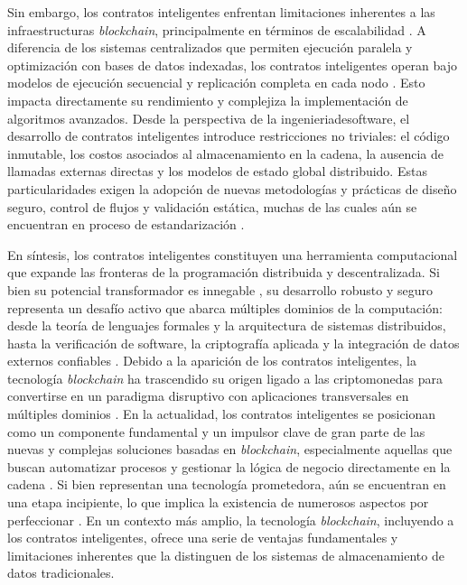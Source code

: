 Sin embargo, los contratos inteligentes enfrentan limitaciones inherentes a las infraestructuras \textit{blockchain}, principalmente en términos de escalabilidad \cite{kalajdjieski2023databases}. A diferencia de los sistemas centralizados que permiten ejecución paralela y optimización con bases de datos indexadas, los contratos inteligentes operan bajo modelos de ejecución secuencial y replicación completa en cada nodo \cite{taherdoost2023smart}. Esto impacta directamente su rendimiento y complejiza la implementación de algoritmos avanzados. Desde la perspectiva de la \gls{ingenieriadesoftware}, el desarrollo de contratos inteligentes introduce restricciones no triviales: el código inmutable, los costos asociados al almacenamiento en la cadena, la ausencia de llamadas externas directas y los modelos de estado global distribuido. Estas particularidades exigen la adopción de nuevas metodologías y prácticas de diseño seguro, control de flujos y validación estática, muchas de las cuales aún se encuentran en proceso de estandarización \cite{taherdoost2023smart, cepal2021economia}.

En síntesis, los contratos inteligentes constituyen una herramienta computacional que expande las fronteras de la programación distribuida y descentralizada. Si bien su potencial transformador es innegable \cite{taherdoost2023smart}, su desarrollo robusto y seguro representa un desafío activo que abarca múltiples dominios de la computación: desde la teoría de lenguajes formales \cite{hoskinson2017we} y la arquitectura de sistemas distribuidos, hasta la verificación de software, la criptografía aplicada y la integración de datos externos confiables \cite{taherdoost2023smart}. Debido a la aparición de los contratos inteligentes, la tecnología \textit{blockchain} ha trascendido su origen ligado a las \glspl{criptomoneda} para convertirse en un paradigma disruptivo con aplicaciones transversales en múltiples dominios \cite{bartolomeo2020introduccion, vaigandla2023review}. En la actualidad, los contratos inteligentes se posicionan como un componente fundamental y un impulsor clave de gran parte de las nuevas y complejas soluciones basadas en \textit{blockchain}, especialmente aquellas que buscan automatizar procesos y gestionar la lógica de negocio directamente en la cadena \cite{sharabati2024blockchain}. Si bien representan una tecnología prometedora, aún se encuentran en una etapa incipiente, lo que implica la existencia de numerosos aspectos por perfeccionar \cite{taherdoost2023smart}. En un contexto más amplio, la tecnología \textit{blockchain}, incluyendo a los contratos inteligentes, ofrece una serie de ventajas fundamentales y limitaciones inherentes que la distinguen de los sistemas de almacenamiento de datos tradicionales.

